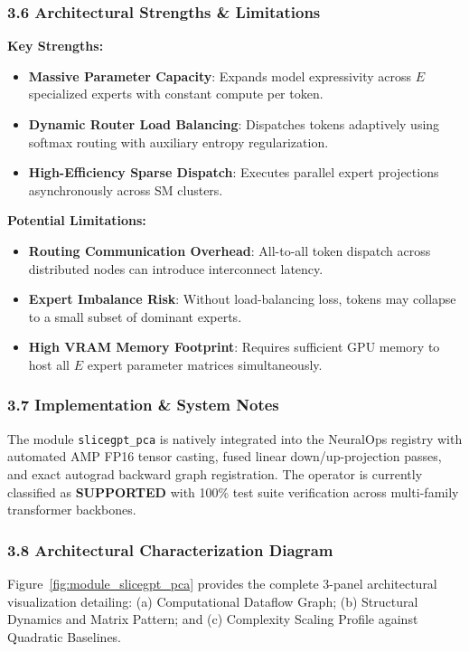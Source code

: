 \subsubsection*{3.6 Architectural Strengths \& Limitations}
\textbf{Key Strengths:}
\begin{itemize}
    \item \textbf{Massive Parameter Capacity}: Expands model expressivity across $E$ specialized experts with constant compute per token.
    \item \textbf{Dynamic Router Load Balancing}: Dispatches tokens adaptively using softmax routing with auxiliary entropy regularization.
    \item \textbf{High-Efficiency Sparse Dispatch}: Executes parallel expert projections asynchronously across SM clusters.
\end{itemize}

\textbf{Potential Limitations:}
\begin{itemize}
    \item \textbf{Routing Communication Overhead}: All-to-all token dispatch across distributed nodes can introduce interconnect latency.
    \item \textbf{Expert Imbalance Risk}: Without load-balancing loss, tokens may collapse to a small subset of dominant experts.
    \item \textbf{High VRAM Memory Footprint}: Requires sufficient GPU memory to host all $E$ expert parameter matrices simultaneously.
\end{itemize}

\subsubsection*{3.7 Implementation \& System Notes}
The module \texttt{slicegpt\_pca} is natively integrated into the NeuralOps registry with automated AMP FP16 tensor casting, fused linear down/up-projection passes, and exact autograd backward graph registration. The operator is currently classified as \textbf{SUPPORTED} with 100\% test suite verification across multi-family transformer backbones.

\subsubsection*{3.8 Architectural Characterization Diagram}
Figure~\ref{fig:module_slicegpt_pca} provides the complete 3-panel architectural visualization detailing: (a) Computational Dataflow Graph; (b) Structural Dynamics and Matrix Pattern; and (c) Complexity Scaling Profile against Quadratic Baselines.

